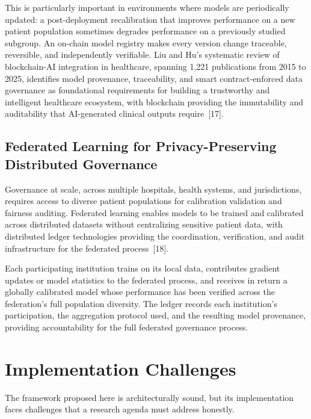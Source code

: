 \documentclass[11pt]{article}
\begin{document}
This is particularly important in environments where models are
periodically updated: a post-deployment recalibration that improves
performance on a new patient population sometimes degrades performance
on a previously studied subgroup. An on-chain model registry makes every
version change traceable, reversible, and independently verifiable. Liu
and Hu's systematic review of blockchain-AI integration in healthcare,
spanning 1,221 publications from 2015 to 2025, identifies model
provenance, traceability, and smart contract-enforced data governance as
foundational requirements for building a trustworthy and intelligent
healthcare ecosystem, with blockchain providing the immutability and
auditability that AI-generated clinical outputs require~{[}17{]}.

\subsection{Federated Learning for Privacy-Preserving Distributed
Governance}\label{federated-learning-for-privacy-preserving-distributed-governance}

Governance at scale, across multiple hospitals, health systems, and
jurisdictions, requires access to diverse patient populations for
calibration validation and fairness auditing. Federated learning enables
models to be trained and calibrated across distributed datasets without
centralizing sensitive patient data, with distributed ledger
technologies providing the coordination, verification, and audit
infrastructure for the federated process~{[}18{]}.

Each participating institution trains on its local data, contributes
gradient updates or model statistics to the federated process, and
receives in return a globally calibrated model whose performance has
been verified across the federation's full population diversity. The
ledger records each institution's participation, the aggregation
protocol used, and the resulting model provenance, providing
accountability for the full federated governance process.


\section{Implementation Challenges}\label{implementation-challenges}

The framework proposed here is architecturally sound, but its
implementation faces challenges that a research agenda must address
honestly.
\end{document}
